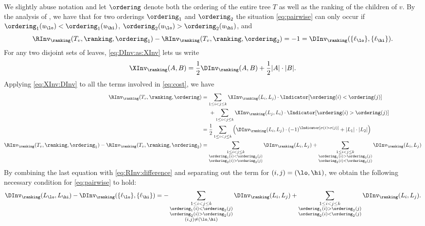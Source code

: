 We slightly abuse notation and  let $\ordering$ denote both the ordering of the entire tree $T$ as well as the ranking of the children of $v$. By the analysis of , we have that for two orderings $\ordering_1$ and $\ordering_2$ the situation \eqref{eq:pairwise} can only occur if $\ordering_1(u_\lo) < \ordering_1(u_\hi)$, $\ordering_2(u_\lo) > \ordering_2(u_\hi)$, and 
\begin{equation}\label{eq:RInv:difference}
\RInv_\ranking(T_v,\ranking,\ordering_1) -
\RInv_\ranking(T_v,\ranking,\ordering_2) = -1 = \DInv_\ranking(\{\ell_\lo\},\{\ell_\hi\}).
\end{equation}
For any two disjoint sets of leaves, \eqref{eq:DInv:as:XInv} lets us write 
\begin{equation}\label{eq:XInv:DInv}
\XInv_\ranking(A,B) =  \frac{1}{2} \DInv_\ranking(A,B) + \frac{1}{2} |A| \cdot |B|.
\end{equation}
Applying \eqref{eq:XInv:DInv} to all the terms involved in \eqref{eq:cost}, we have
\begin{align*}
\RInv_\ranking(T_v,\ranking,\ordering) 
& = \sum_{1 \le i < j \le k} \XInv_\ranking(L_i,L_j) \cdot \Indicator[\ordering(i) < \ordering(j)] \\
& \;\;\;\;\; + \sum_{1 \le i < j \le k} \XInv_\ranking(L_j,L_i) \cdot \Indicator[\ordering(i) > \ordering(j)] \\
& = \frac{1}{2} \sum_{1 \le i < j \le k} \left( \DInv_\ranking(L_i,L_j) \cdot (-1)^{\Indicator[\sigma(i > \sigma(j)]} + |L_1| \cdot |L_2| \right) \\
\RInv_\ranking(T_v,\ranking,\ordering_1) -
\RInv_\ranking(T_v,\ranking,\ordering_2)
& = 
\sum\limits_{\substack{1 \le i < j \le k \\ \ordering_1(i) < \ordering_2(j) \\ \ordering_2(i) > \ordering_2(j)}}\DInv_\ranking(L_i,L_j)
+ \sum\limits_{\substack{1 \le i < j \le k \\ \ordering_1(i) > \ordering_2(j) \\ \ordering_2(i) < \ordering_2(j)}} \DInv_\ranking(L_i,L_j)
\end{align*}
By combining the last equation with \eqref{eq:RInv:difference} and separating out the term for $(i,j)=(\lo,\hi)$, we obtain the following necessary condition for \eqref{eq:pairwise} to hold:
\begin{equation}\label{eq:necessary}
\DInv_\ranking(L_\lo,L_\hi) - \DInv_\ranking(\{\ell_\lo\},\{\ell_\hi\})
= -\sum\limits_{\substack{1 \le i < j \le k \\ \ordering_1(i) < \ordering_2(j) \\ \ordering_2(i) > \ordering_2(j) \\ (i,j) \ne (\lo,\hi)}} \DInv_\ranking(L_i,L_j)
+ \sum\limits_{\substack{1 \le i < j \le k \\ \ordering_1(i) > \ordering_2(j) \\ \ordering_2(i) < \ordering_2(j)}} \DInv_\ranking(L_i,L_j).
\end{equation} 

